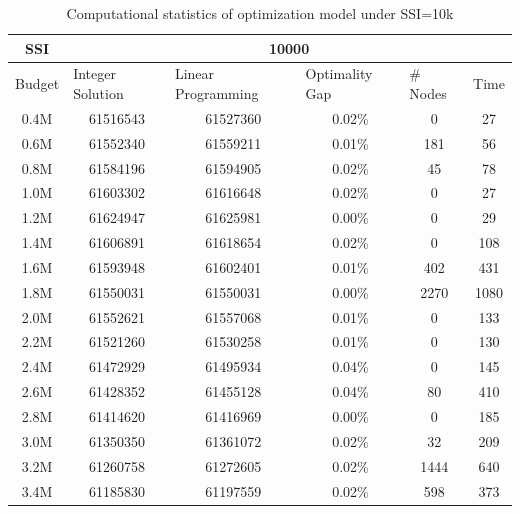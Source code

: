 \documentclass[12pt,english]{report}
\begin{document}
\begin{table}[ht]
\centering
\caption{Computational statistics of optimization model under SSI=10k}
\label{ssi10k}
\begin{tabular}{|c|c|c|c|c|c|}
\hline
SSI                          & \multicolumn{5}{c|}{10000}                      
\\ \hline
\multicolumn{1}{|l|}{Budget} & \multicolumn{1}{l|}{Integer Solution} &
\multicolumn{1}{l|}{Linear Programming} & \multicolumn{1}{l|}{Optimality Gap} &
\multicolumn{1}{l|}{\# Nodes} & \multicolumn{1}{l|}{Time} \\
\hline
0.4M   & 61516543    & 61527360
& 0.02\%    & 0    &27                           \\ \hline
0.6M     & 61552340    & 61559211
& 0.01\%    & 181     &56                        \\ \hline
0.8M   & 61584196    & 61594905
& 0.02\%         & 45         &78                 \\ \hline
1.0M   & 61603302   & 61616648
& 0.02\%     & 0     &27                          \\ \hline
1.2M   & 61624947    & 61625981
& 0.00\%    & 0       &29                         \\ \hline
1.4M      & 61606891    & 61618654
& 0.02\%      & 0          & 108                  \\ \hline
1.6M    & 61593948      & 61602401
& 0.01\%      & 402     &431                      \\ \hline
1.8M       & 61550031         & 61550031
& 0.00\%         & 2270     &1080                 \\ \hline
2.0M       & 61552621       & 61557068
& 0.01\%      & 0          &133                   \\ \hline
2.2M     & 61521260       & 61530258
& 0.01\%    & 0     & 130                         \\ \hline
2.4M   & 61472929   & 61495934
& 0.04\%       & 0   &145                         \\ \hline
2.6M   & 61428352   & 61455128
& 0.04\%     & 80    &410                         \\ \hline
2.8M    & 61414620      & 61416969
& 0.00\%        & 0        &185                   \\ \hline
3.0M    & 61350350     & 61361072
& 0.02\%    & 32    & 209                         \\ \hline
3.2M    & 61260758  & 61272605
& 0.02\%   & 1444      &640                        \\ \hline
3.4M    & 61185830   & 61197559
& 0.02\%   & 598    & 373                          \\ \hline
\end{tabular}
\end{table}
\end{document}
